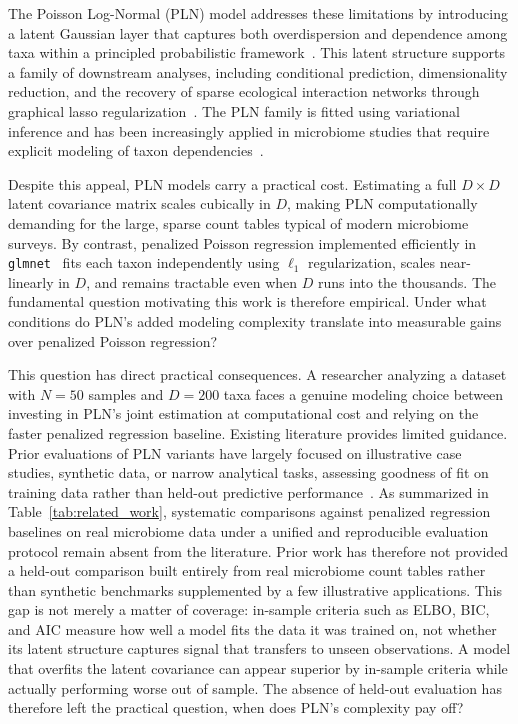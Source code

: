 \documentclass[useAMS,usenatbib,referee]{biom}
\begin{document}
The Poisson Log-Normal (PLN) model addresses these limitations by introducing a latent Gaussian layer that captures both overdispersion and dependence among taxa within a principled probabilistic framework~\citep{aitchison1989multivariate, Chiquet2021}.
This latent structure supports a family of downstream analyses, including conditional prediction, dimensionality reduction, and the recovery of sparse ecological interaction networks through graphical lasso regularization~\citep{chiquet2019variational}.
The PLN family is fitted using variational inference and has been increasingly applied in microbiome studies that require explicit modeling of taxon dependencies~\citep{Chiquet2021, Subedi2025}.

Despite this appeal, PLN models carry a practical cost.
Estimating a full $D \times D$ latent covariance matrix scales cubically in $D$, making PLN computationally demanding for the large, sparse count tables typical of modern microbiome surveys.
By contrast, penalized Poisson regression implemented efficiently in \texttt{glmnet}~\citep{Friedman2010} fits each taxon independently using $\ell_1$ regularization, scales near-linearly in $D$, and remains tractable even when $D$ runs into the thousands.
The fundamental question motivating this work is therefore empirical.
Under what conditions do PLN's added modeling complexity translate into measurable gains over penalized Poisson regression?

This question has direct practical consequences.
A researcher analyzing a dataset with $N = 50$ samples and $D = 200$ taxa faces a genuine modeling choice between investing in PLN's joint estimation at computational cost and relying on the faster penalized regression baseline.
Existing literature provides limited guidance.
Prior evaluations of PLN variants have largely focused on illustrative case studies, synthetic data, or narrow analytical tasks, assessing goodness of fit on training data rather than held-out predictive performance~\citep{Chiquet2021, Batardiere2025ZIPLN, Chaussard2025PLNTree}.
As summarized in Table~\ref{tab:related_work}, systematic comparisons against penalized regression baselines on real microbiome data under a unified and reproducible evaluation protocol remain absent from the literature.
Prior work has therefore not provided a held-out comparison built entirely from real microbiome count tables rather than synthetic benchmarks supplemented by a few illustrative applications.
This gap is not merely a matter of coverage: in-sample criteria such as ELBO, BIC, and AIC measure how well a model fits the data it was trained on, not whether its latent structure captures signal that transfers to unseen observations.
A model that overfits the latent covariance can appear superior by in-sample criteria while actually performing worse out of sample.
The absence of held-out evaluation has therefore left the practical question, when does PLN's complexity pay off?
\end{document}

